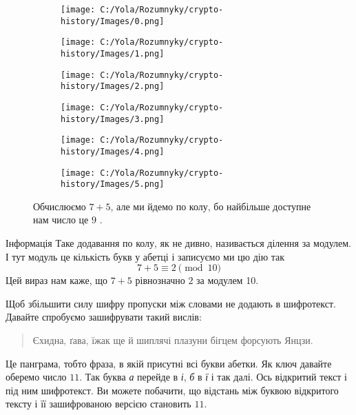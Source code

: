 \documentclass{book}
\begin{document}
\begin{figure}[hbt!]
	\centering
	\begin{subfigure}{0.17\textwidth}
		\texttt{[image: C:/Yola/Rozumnyky/crypto-history/Images/0.png]}
	\end{subfigure}%
	\begin{subfigure}{0.17\textwidth}
		\texttt{[image: C:/Yola/Rozumnyky/crypto-history/Images/1.png]}
	\end{subfigure}%
	\begin{subfigure}{0.17\textwidth}
		\texttt{[image: C:/Yola/Rozumnyky/crypto-history/Images/2.png]}
	\end{subfigure}%
	\begin{subfigure}{0.17\textwidth}
		\texttt{[image: C:/Yola/Rozumnyky/crypto-history/Images/3.png]}
	\end{subfigure}%
	\begin{subfigure}{0.17\textwidth}
		\texttt{[image: C:/Yola/Rozumnyky/crypto-history/Images/4.png]}
	\end{subfigure}%
	\begin{subfigure}{0.17\textwidth}
		\texttt{[image: C:/Yola/Rozumnyky/crypto-history/Images/5.png]}
	\end{subfigure}%
	\caption{Обчислюємо $7+5$, але ми йдемо по колу, бо найбільше доступне нам число це $9$ .}
\end{figure}

\begin{bclogo}[logo=\bcinfo, couleurBarre=orange, noborder=true, couleur=white]{Інформація}
	Таке додавання по колу, як не дивно, називається ділення за модулем. І тут
	модуль це кількість букв у абетці і записуємо ми цю дію так
	$$ 7 + 5 \equiv 2 \pmod{10} $$
	Цей вираз нам каже, що $7 + 5$ рівнозначно $2$ за модулем 10. 
\end{bclogo}

Щоб збільшити силу шифру пропуски між словами не додають в шифротекст.
Давайте спробуємо зашифрувати такий вислів:

\begin{quote}
	Єхидна, ґава, їжак ще й шиплячі плазуни бігцем форсують Янцзи.
\end{quote}

Це панграма, тобто фраза, в якій присутні всі букви абетки. Як ключ давайте
оберемо число $11$. Так буква \emph{а} перейде в \emph{і}, \emph{б} в \emph{ї} і
так далі. Ось відкритий текст і під ним шифротекст. Ви можете побачити, що
відстань між буквою відкритого тексту і її зашифрованою версією становить $11$.
\end{document}
